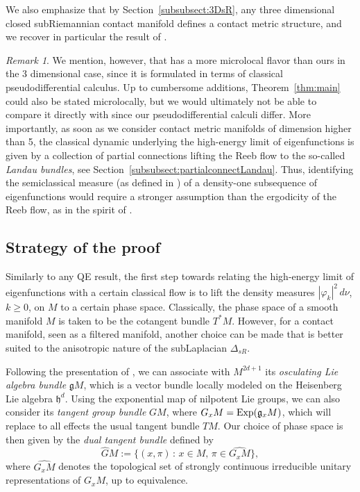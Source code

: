 \documentclass[12pt,a4paper]{amsart}
\theoremstyle{plain}
\theoremstyle{definition}
\theoremstyle{remark}
\newtheorem{remark}[theorem]{Remark}
\numberwithin{equation}{section}
\theoremstyle{definition}
\def \Ghat{\widehat{G}}
\numberwithin{equation}{section}
\begin{document}
We also emphasize that by Section~\ref{subsubsect:3DsR}, any three dimensional closed subRiemannian contact manifold defines a contact metric structure, and we recover in particular the result of \cite{CdVHT18}.

\begin{remark}
    We mention, however, that \cite[Theorem A]{CdVHT18} has a more microlocal flavor than ours in the 3 dimensional case, since it is formulated in terms of classical pseudodifferential calculus. Up to cumbersome additions, Theorem~\ref{thm:main} could also be stated microlocally, but we would ultimately not be able to compare it directly with \cite[Theorem A]{CdVHT18} since our pseudodifferential calculi differ. More importantly, as soon as we consider contact metric manifolds of dimension higher than 5, the classical dynamic underlying the high-energy limit of eigenfunctions is given by a collection of partial connections lifting the Reeb flow to the so-called \emph{Landau bundles}, see Section~\ref{subsubsect:partialconnectLandau}. Thus, identifying the semiclassical measure (as defined in \cite{BFF25}) of a density-one subsequence of eigenfunctions would require a stronger assumption than the ergodicity of the Reeb flow, as in the spirit of \cite{JS}.
\end{remark}

\subsection{Strategy of the proof}

Similarly to any QE result, the first step towards relating the high-energy limit of eigenfunctions with a certain classical flow is to lift the density measures $|\varphi_k|^2\,d\nu$, $k\geq 0$, on $M$ to a certain phase space. Classically, the phase space of a smooth manifold $M$ is taken to be the cotangent bundle $T^*M$. However, for a contact manifold, seen as a filtered manifold, another choice can be made that is better suited to the anisotropic nature of the subLaplacian $\Delta_{sR}$. 

Following the presentation of \cite{FFF24}, we can associate with $M^{2d+1}$ its \emph{osculating Lie algebra bundle} $\mathfrak{g}M$, which is a vector bundle locally modeled on the Heisenberg Lie algebra $\mathfrak{h}^d$. Using the exponential map of nilpotent Lie groups, we can also consider its \emph{tangent group bundle} $GM$, where $G_xM = {\rm Exp}(\mathfrak{g}_xM)$, which will replace to all effects the usual tangent bundle $TM$. Our choice of phase space is then given by the \emph{dual tangent bundle} defined by
\begin{equation*}
    \Ghat M := \{(x,\pi)\,:\,x\in M,\,\pi\in\widehat{G_x M}\},
\end{equation*}
where $\widehat{G_x M}$ denotes the topological set of strongly continuous irreducible unitary representations of $G_xM$, up to equivalence.
\end{document}
